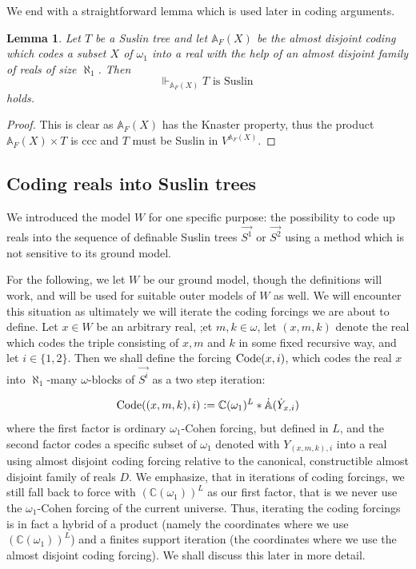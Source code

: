 \documentclass[a4paper,11pt]{article}
\newtheorem{lemma}[theorem]{Lemma}
\begin{document}
We end with a straightforward lemma which is used later in coding arguments.

\begin{lemma}\label{a.d.coding preserves Suslin trees}
 Let $T$ be a Suslin tree and let $\mathbb{A}_F(X)$ be the almost disjoint coding which codes
 a subset $X$ of $\omega_1$ into a real with the help of an almost disjoint family
 of reals of size $\aleph_1$. Then $$\Vdash_{\mathbb{A}_{F}(X)} T \text{ is Suslin }$$
 holds.
\end{lemma}
\begin{proof}
 This is clear as $\mathbb{A}_{F}(X)$ has the Knaster property, thus the product $\mathbb{A}_{F}(X) \times T$ is ccc and $T$ must be Suslin in $V^{\mathbb{A}_{F}(X)}$. 
\end{proof}



 



\subsection{Coding reals into Suslin trees}
We introduced the model $W$ for one specific purpose: the possibility to code up reals into the sequence of definable Suslin trees $\vec{S^1}$ or $\vec{S^2}$ using a method which is not sensitive to its ground model.

For the following, we let $W$ be our ground model, though the definitions will work, and will be used for suitable outer models of $W$ as well. We will encounter this situation as ultimately we will iterate the coding forcings we are about to define.
Let $x \in W$  be an arbitrary real, ;et $m,k \in \omega$, let $(x,m,k)$ denote the real which codes the triple consisting of $x,m$ and $k$ in some fixed recursive way, and let $i \in \{ 1,2\}$. Then we shall define the forcing $\hbox{Code}(x,i)$, which codes the real $x$ into $\aleph_1$-many $\omega$-blocks of $\vec{S^i}$ as a two step iteration:

\[ \hbox{Code}((x,m,k),i):= \mathbb{C} (\omega_1)^L \ast \dot{\mathbb{A}} (\dot{Y}_{x,i}) \]
where the first factor is ordinary $\omega_1$-Cohen forcing, but defined in $L$, and the second factor codes a specific subset of $\omega_1$ denoted with $Y_{(x,m,k),i}$ into a real using almost disjoint coding forcing relative to the canonical, constructible almost disjoint family of reals $D$.
We emphasize, that in iterations of coding forcings, we still fall back to force with $(\mathbb{C} (\omega_1))^L$ as our first factor, that is we never use the $\omega_1$-Cohen forcing of the current universe. Thus, iterating the coding forcings is in fact a hybrid of a product (namely the coordinates where we use $(\mathbb{C}(\omega_1))^L$)  and a finites support iteration (the coordinates where we use the almost disjoint coding forcing). We shall discuss this later in more detail.
\end{document}
